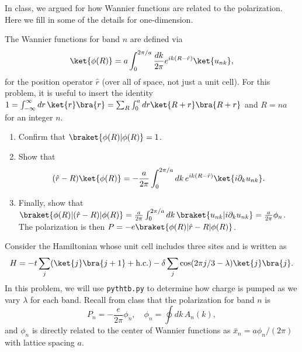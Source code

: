 \documentclass{jhwhw}
\begin{document}
In class, we argued for how Wannier functions are related to the polarization. Here we fill in some of the details for one-dimension.

The Wannier functions for band $n$ are defined via
\begin{equation}
  \label{eq:8}
  \ket{\phi(R)} = a \int_{0}^{2\pi/a} \frac{dk}{2\pi} e^{ik(R - \hat r)} \ket{u_{nk}},
\end{equation}
for the position operator $\hat r$ (over all of space, not just a unit cell). For this problem, it is useful to insert the identity $1 = \int_{-\infty}^{\infty} dr \, \ket{r}\bra{r} = \sum_{R} \int_{0}^{a} dr \ket{R + r} \bra{R + r}$ and $R = n a$ for an integer $n$.
\begin{enumerate}
  \item Confirm that $\braket{\phi(R)| \phi(R)} = 1$.
  \item Show that
        \begin{equation}
          \label{eq:9}
          (\hat r - R) \ket{\phi(R)} = -\frac{a}{2\pi} \int_{0}^{2\pi/a} dk \, e^{ik(R - \hat r)} \ket{i \partial_{k} u_{nk}}.
        \end{equation}

  \item Finally, show that $\braket{\phi(R) | (\hat r - R) | \phi(R)} = \frac{a}{2\pi} \int_{0}^{2\pi/a} dk \, \braket{u_{nk} | i \partial_{k} u_{nk}} = \frac{a}{2\pi} \phi_{n}$. The polarization is then $P = -e \braket{\phi(R)| \hat{r} - R | \phi(R)}$.
\end{enumerate}


Consider the Hamiltonian whose unit cell includes three sites and is written as
\begin{equation}
  \label{eq:6}
  H = -t \sum_{j} (\ket{j} \bra{j+1} + \mathrm{h.c.}) - \delta \sum_{j} \cos(2\pi j/3 - \lambda) \ket{j}\bra{j}.
\end{equation}
In this problem, we will use \texttt{pythtb.py} to determine how charge is pumped as we vary $\lambda$ for each band. Recall from class that the polarization for band $n$ is
\begin{equation}
  \label{eq:7}
  P_{n} = -\frac{e}{2\pi} \phi_{n}, \quad \phi_{n} = \oint dk\, A_{n}(k),
\end{equation}
and $\phi_{n}$ is directly related to the center of Wannier functions as $\bar x_{n} = a \phi_{n}/(2\pi)$ with lattice spacing $a$.
\end{document}
